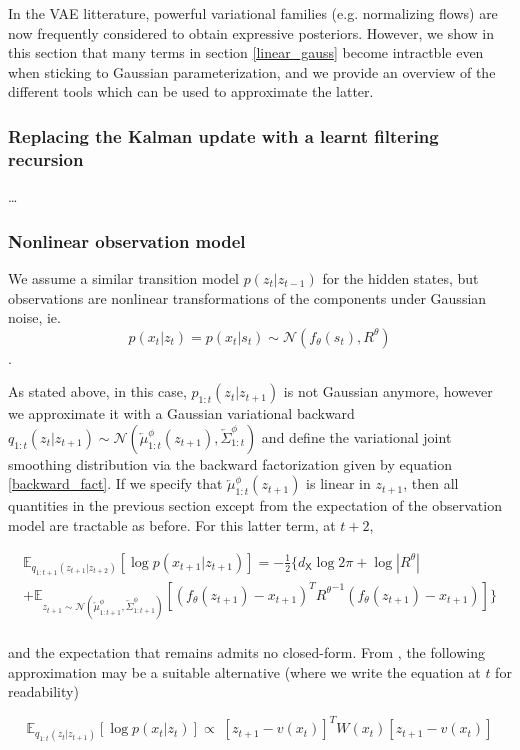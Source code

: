 \documentclass{article}
\newcommand{\1}{\mathbbm{1}}
\newcommand{\eqsp}{\;}
\newcommand{\expect}[2]{\mathbb{E}_{#1}\left[#2\right]}
\newcommand{\gaussian}[2]{\mathcal{N}\left( #1, #2 \right)}
\newcommand{\backward}[1]{\overleftarrow{#1}}
\newcommand{\vbackward}[1]{q_{1:#1}(z_{#1}|z_{#1 + 1})}
\newcommand{\vbackwardparam}[2]{\backward{#1}_{1:#2}^\phi}
\newcommand{\vbackwardmean}[1]{\vbackwardparam{\mu}{#1}}
\newcommand{\vbackwardcov}[1]{\vbackwardparam{\Sigma}{#1}}
\newcommand{\inv}[1]{{#1}^{-1}}
\newcommand{\quadform}[2]{#1^T #2 #1}
\begin{document}
In the VAE litterature, powerful variational families (e.g. normalizing flows) are now frequently considered to obtain expressive posteriors. However, we show in this section that many terms in section \ref{linear_gauss} become intractble even when sticking to Gaussian parameterization, and we provide an overview of the different tools which can be used to approximate the latter. 

\subsubsection*{Replacing the Kalman update with a learnt filtering recursion}
\dots

\subsubsection*{Nonlinear observation model}

We assume a similar transition model $p(z_t|z_{t-1})$ for the hidden states, but observations are nonlinear transformations of the components under Gaussian noise, ie. $$p(x_t|z_t) = p(x_t|s_t) \sim \gaussian{f_\theta(s_t)}{R^\theta}$$. 

As stated above, in this case, $p_{1:t}(z_t|z_{t+1})$ is not Gaussian anymore, however we approximate it with a Gaussian variational backward $\vbackward{t} \sim \gaussian{\vbackwardmean{t}(z_{t+1})}{\vbackwardcov{t}}$ and define the variational joint smoothing distribution via the backward factorization given by equation \ref{backward_fact}. If we specify that $\vbackwardmean{t}(z_{t+1})$ is linear in $z_{t+1}$, then all quantities in the previous section except from the expectation of the observation model are tractable as before. For this latter term, at $t+2$, 

\begin{multline*}
\expect{q_{1:t+1}(z_{t+1}|z_{t+2})}{\log p(x_{t+1}|z_{t+1})} = -\frac{1}{2}\{d_{\mathsf{X}}\log 2\pi + \log |R^\theta| \\
    + \expect{z_{t+1} \sim \gaussian{\vbackwardmean{t+1}}{\vbackwardcov{t+1}}}{\quadform{(f_\theta(z_{t+1}) - x_{t+1})}{\inv{R^\theta}}}\} \\
\end{multline*}

and the expectation that remains admits no closed-form. From \cite{johnson}, the following approximation may be a suitable alternative (where we write the equation at $t$ for readability)

\begin{equation}
    \expect{\vbackward{t}}{\log p(x_t|z_t)} \propto \eqsp \quadform{[z_{t+1} - v(x_t)]}{W(x_t)}
\end{equation}
\end{document}
